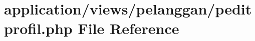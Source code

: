 \hypertarget{peditprofil_8php}{}\section{application/views/pelanggan/peditprofil.php File Reference}
\label{peditprofil_8php}
